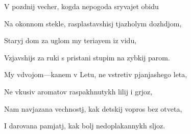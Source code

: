 
 V pozdnij vecher, kogda nepogoda sryvajet obidu

  Na okonnom stekle, rasplastavshisj tjazholym dozhdjom,

  Staryj dom za uglom my teriayem iz vidu,

  Vzjavshijs za ruki s pristani stupim na zybkij parom.


  My vdvojom---kanem v Letu, ne vstretiv pjanjashego leta,

  Ne vkusiv aromatov raspakhnutykh lilij i grjoz,

  Nam navjazana vechnostj, kak detskij vopros bez otveta,

  I darovana pamjatj, kak bolj nedoplakannykh sljoz.
  \bye
